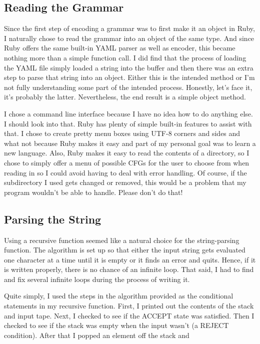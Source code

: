 \documentclass[11pt]{article}
\begin{document}
\subsection{Reading the Grammar}
Since the first step of encoding a grammar was to first make it an object in Ruby, I naturally chose to read the grammar into an object of the same type. And since Ruby offers the same built-in YAML parser as well as encoder, this became nothing more than a simple function call. I did find that the process of loading the YAML file simply loaded a string into the buffer and then there was an extra step to parse that string into an object. Either this is the intended method or I'm not fully understanding some part of the intended process. Honestly, let's face it, it's probably the latter. Nevertheless, the end result is a simple object method.

I chose a command line interface because I have no idea how to do anything else. I should look into that. Ruby has plenty of simple built-in features to assist with that. I chose to create pretty menu boxes using UTF-8 corners and sides and what not because Ruby makes it easy and part of my personal goal was to learn a new language. Also, Ruby makes it easy to read the contents of a directory, so I chose to simply offer a menu of possible CFGs for the user to choose from when reading in so I could avoid having to deal with error handling. Of course, if the subdirectory I used gets changed or removed, this would be a problem that my program wouldn't be able to handle. Please don't do that!

\subsection{Parsing the String}
Using a recursive function seemed like a natural choice for the string-parsing function. The algorithm is set up so that either the input string gets evaluated one character at a time until it is empty or it finds an error and quits. Hence, if it is written properly, there is no chance of an infinite loop. That said, I had to find and fix several infinite loops during the process of writing it.

Quite simply, I used the steps in the algorithm provided as the conditional statements in my recursive function. First, I printed out the contents of the stack and input tape. Next, I checked to see if the ACCEPT state was satisfied. Then I checked to see if the stack was empty when the input wasn't (a REJECT condition). After that I popped an element off the stack and 
\end{document}
